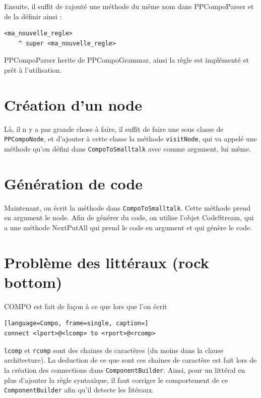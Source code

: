 \documentclass[11pt,a4paper,openany,oneside]{book}
\begin{document}
\begin{appendices}
Ensuite, il suffit de rajouté une méthode du même nom dans PPCompoParser et de la définir ainsi :


\begin{lstlisting}[language=Compo, frame=single, caption=Création d'une régle]
<ma_nouvelle_regle>
	^ super <ma_nouvelle_regle>
\end{lstlisting}
	
PPCompoParser herite de PPCompoGrammar, ainsi la règle est implémenté et prêt à l'utilisation.

\section*{Création d'un node}
Là, il n y a pas grande chose à faire, il suffit de faire une sous classe de \texttt{PPCompoNode}, et d'ajouter à cette classe la méthode \texttt{visitNode}, 
qui va appelé une méthode qu'on défini dans \texttt{CompoToSmalltalk} avec comme argument, lui même.

\section*{Génération de code}
Maintenant, on écrit la méthode dans \texttt{CompoToSmalltalk}. Cette méthode prend en argument le node.
Afin de générer du code, on utilise l'objet CodeStream, qui a une méthode NextPutAll qui prend le code en argument et qui génère le code.

\section*{Problème des littéraux (rock bottom)}
COMPO est fait de façon à ce que lors que l'on écrit

\begin{lstlisting}[language=Compo, frame=single, caption=]
connect <lport>@<lcomp> to <rport>@<rcomp>
\end{lstlisting}

\texttt{lcomp} et \texttt{rcomp} sont des
chaines de caractères (du moins dans la clause architecture). La deduction de ce que sont ces chaines de caractère est fait 
lors de la création des connections dans \texttt{ComponentBuilder}. Ainsi, pour un littéral en plus d'ajouter la règle syntaxique, il faut
corriger le comportement de ce \texttt{ComponentBuilder} afin qu'il detecte les litéraux.


\end{appendices}
\glsaddall
\end{document}
